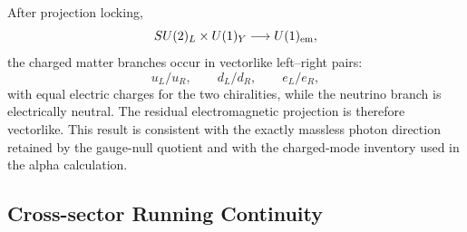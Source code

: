 \documentclass[11pt]{article}
\begin{document}
After projection locking,
\begin{equation}
SU(2)_L\times U(1)_Y
\longrightarrow
U(1)_{\rm em},
\end{equation}
the charged matter branches occur in vectorlike left--right pairs:
\begin{equation}
u_L/u_R,\qquad
d_L/d_R,\qquad
e_L/e_R,
\end{equation}
with equal electric charges for the two chiralities, while the neutrino branch is electrically neutral.  The residual electromagnetic projection is therefore vectorlike.  This result is consistent with the exactly massless photon direction retained by the gauge-null quotient and with the charged-mode inventory used in the alpha calculation.

\subsection{Cross-sector Running Continuity}
\label{subsec:priii-running-continuity}
\end{document}

